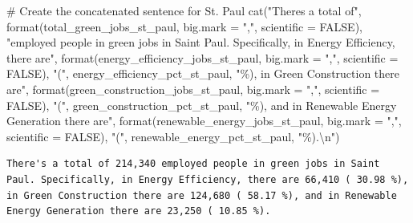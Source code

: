 \documentclass[
  letterpaper,
  DIV=11,
  numbers=noendperiod]{scrartcl}
\newenvironment{Shaded}{\begin{snugshade}}{\end{snugshade}}
\newcommand{\AttributeTok}[1]{\textcolor[rgb]{0.40,0.45,0.13}{#1}}
\newcommand{\CommentTok}[1]{\textcolor[rgb]{0.37,0.37,0.37}{#1}}
\newcommand{\ConstantTok}[1]{\textcolor[rgb]{0.56,0.35,0.01}{#1}}
\newcommand{\FunctionTok}[1]{\textcolor[rgb]{0.28,0.35,0.67}{#1}}
\newcommand{\NormalTok}[1]{\textcolor[rgb]{0.00,0.23,0.31}{#1}}
\newcommand{\SpecialCharTok}[1]{\textcolor[rgb]{0.37,0.37,0.37}{#1}}
\newcommand{\StringTok}[1]{\textcolor[rgb]{0.13,0.47,0.30}{#1}}
\begin{document}
\begin{Shaded}
\begin{Highlighting}[]
\CommentTok{\# Create the concatenated sentence for St. Paul}
\FunctionTok{cat}\NormalTok{(}\StringTok{"There\textquotesingle{}s a total of"}\NormalTok{, }\FunctionTok{format}\NormalTok{(total\_green\_jobs\_st\_paul, }\AttributeTok{big.mark =} \StringTok{","}\NormalTok{, }\AttributeTok{scientific =} \ConstantTok{FALSE}\NormalTok{), }
    \StringTok{"employed people in green jobs in Saint Paul. Specifically, in Energy Efficiency, there are"}\NormalTok{, }
    \FunctionTok{format}\NormalTok{(energy\_efficiency\_jobs\_st\_paul, }\AttributeTok{big.mark =} \StringTok{","}\NormalTok{, }\AttributeTok{scientific =} \ConstantTok{FALSE}\NormalTok{), }
    \StringTok{"("}\NormalTok{, energy\_efficiency\_pct\_st\_paul, }\StringTok{"\%), in Green Construction there are"}\NormalTok{, }
    \FunctionTok{format}\NormalTok{(green\_construction\_jobs\_st\_paul, }\AttributeTok{big.mark =} \StringTok{","}\NormalTok{, }\AttributeTok{scientific =} \ConstantTok{FALSE}\NormalTok{), }
    \StringTok{"("}\NormalTok{, green\_construction\_pct\_st\_paul, }\StringTok{"\%), and in Renewable Energy Generation there are"}\NormalTok{, }
    \FunctionTok{format}\NormalTok{(renewable\_energy\_jobs\_st\_paul, }\AttributeTok{big.mark =} \StringTok{","}\NormalTok{, }\AttributeTok{scientific =} \ConstantTok{FALSE}\NormalTok{), }
    \StringTok{"("}\NormalTok{, renewable\_energy\_pct\_st\_paul, }\StringTok{"\%).}\SpecialCharTok{\textbackslash{}n}\StringTok{"}\NormalTok{)}
\end{Highlighting}
\end{Shaded}

\begin{verbatim}
There's a total of 214,340 employed people in green jobs in Saint Paul. Specifically, in Energy Efficiency, there are 66,410 ( 30.98 %), in Green Construction there are 124,680 ( 58.17 %), and in Renewable Energy Generation there are 23,250 ( 10.85 %).
\end{verbatim}
\end{document}
